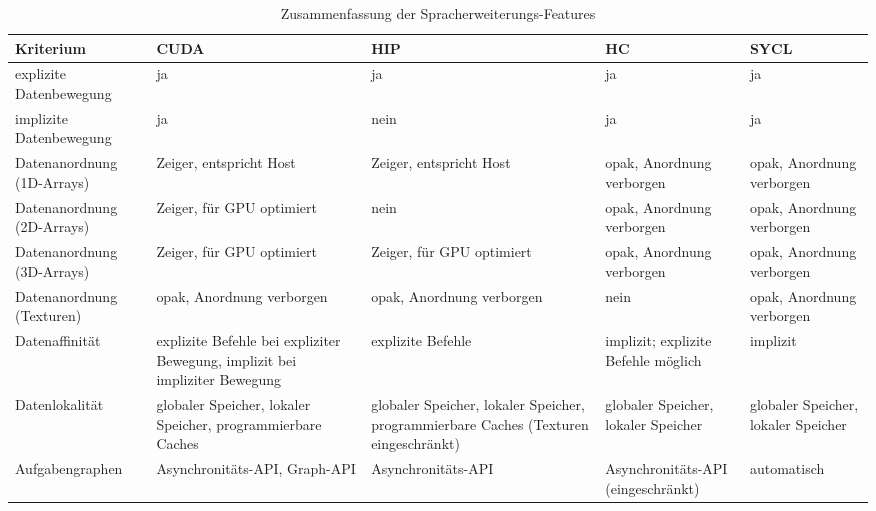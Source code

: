\begin{table}[htb]
    \centering
    \begin{tabularx}{\linewidth}{|X|X|X|X|X|}
        \hline
        Kriterium & CUDA & HIP & HC & SYCL\\ \hline\hline
        explizite Datenbewegung & ja & ja & ja & ja\\ \hline
        implizite Datenbewegung & ja & nein & ja & ja\\ \hline\hline
        Datenanordnung (1D-Arrays) & Zeiger, entspricht Host & Zeiger, entspricht Host & opak, Anordnung verborgen & opak, Anordnung verborgen\\ \hline
        Datenanordnung (2D-Arrays) & Zeiger, für GPU optimiert & nein & opak, Anordnung verborgen & opak, Anordnung verborgen\\\hline
        Datenanordnung (3D-Arrays) & Zeiger, für GPU optimiert & Zeiger, für GPU optimiert & opak, Anordnung verborgen & opak, Anordnung verborgen\\\hline
        Datenanordnung (Texturen) & opak, Anordnung verborgen & opak, Anordnung verborgen & nein & opak, Anordnung verborgen\\\hline\hline
        Datenaffinität & explizite Befehle bei expliziter Bewegung, implizit bei impliziter Bewegung & explizite Befehle & implizit; explizite Befehle möglich & implizit\\\hline\hline
        Datenlokalität & globaler Speicher, lokaler Speicher, programmierbare Caches & globaler Speicher, lokaler Speicher, programmierbare Caches (Texturen eingeschränkt) & globaler Speicher, lokaler Speicher & globaler Speicher, lokaler Speicher\\ \hline\hline
        Aufgabengraphen & Asynchronitäts-API, Graph-API & Asynchronitäts-API & Asynchronitäts-API (eingeschränkt) & automatisch\\\hline
    \end{tabularx}
    \caption{Zusammenfassung der Spracherweiterungs-Features}
    \label{vergleich:zusammenfassung:tabelle}
\end{table}
